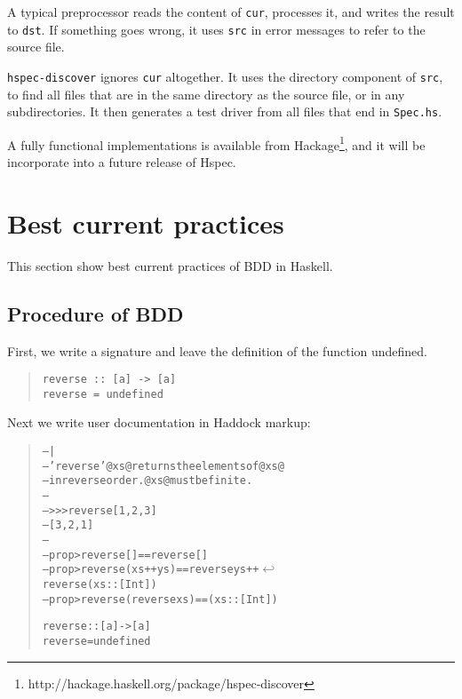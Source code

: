 \documentclass[preprint]{sigplanconf}
\begin{document}
\noindent A typical preprocessor reads the content of {\tt cur},
processes it, and writes the result to {\tt dst}.  If something goes
wrong, it uses {\tt src} in error messages to refer to the source
file.

\verb|hspec-discover| ignores {\tt cur} altogether.  It uses the
directory component of {\tt src}, to find all files that are in the
same directory as the source file, or in any subdirectories.  It then generates
a test driver from all files that end in {\tt Spec.hs}.

A fully functional implementations is available from
Hackage\footnote{http://hackage.haskell.org/package/hspec-discover},
and it will be incorporate into a future release of Hspec.

\section{Best current practices}
\label{sec:best-current-practice}

This section show best current practices of
BDD in Haskell.

\subsection{Procedure of BDD}

First, we write a signature and leave the definition of the function undefined.

\begin{quote}
\small
\begin{verbatim}
reverse :: [a] -> [a]
reverse = undefined
\end{verbatim}
\end{quote}

\noindent Next we write user documentation in Haddock markup:

\begin{quote}
\small
\begin{alltt}
-- |
-- 'reverse' @xs@ returns the elements of @xs@
-- in reverse order. @xs@ must be finite.
--
-- >>> reverse [1,2,3]
-- [3,2,1]
--
-- prop> reverse [] == reverse []
-- prop> reverse (xs ++ ys) == reverse ys ++ \(\hookleftarrow\)
                               reverse (xs::[Int])
-- prop> reverse (reverse xs) == (xs::[Int])

reverse :: [a] -> [a]
reverse = undefined
\end{alltt}
\end{quote}
\end{document}
